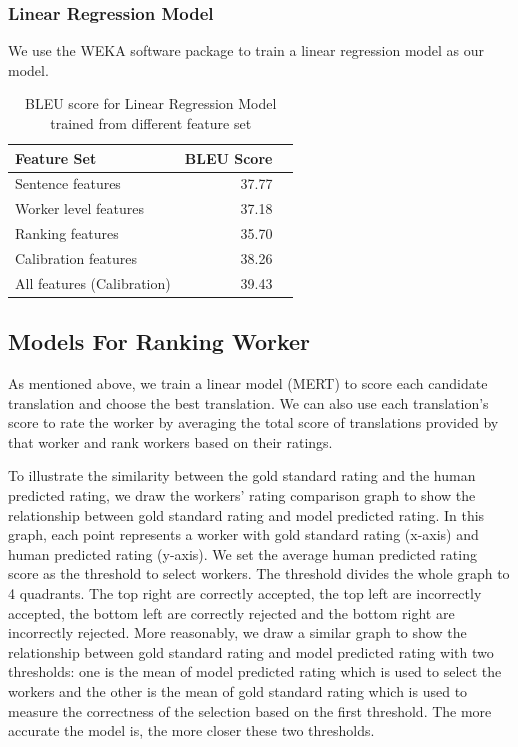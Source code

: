 \documentclass[11pt]{article}
\begin{document}
\subsubsection{Linear Regression  Model}
 We use the WEKA software package \cite{hall2009weka} to train a linear regression model as our model.
 \begin{table}[htbp]
\begin{center}
\begin{tabular}{|l|rl|}
\hline \bf Feature Set & \bf BLEU Score &\\ \hline
Sentence features & 37.77 &\\
Worker level features & 37.18  &\\
Ranking features & 35.70& \\
Calibration features & 38.26&\\
All features (Calibration) & 39.43 & \\
\hline
\end{tabular}
\end{center}
\caption{\label{tlrbleu} BLEU score for Linear Regression Model trained from different feature set }
\end{table}

\subsection{Models For Ranking Worker} 

As mentioned above, we train a linear model (MERT) to score each candidate translation and choose the best translation. We can also use each translation's score to rate the worker by averaging the total score of translations provided by that worker and rank workers based on their ratings. 

To illustrate the similarity between the gold standard rating and the human predicted rating, we draw the  workers' rating comparison graph to show the relationship between gold standard rating and model predicted rating. In this graph, each point represents a worker with gold standard rating (x-axis) and human predicted rating (y-axis). We set the average human predicted rating score as the threshold to select workers. The threshold divides the whole graph to  4 quadrants. The top right are correctly accepted, the top left are incorrectly accepted, the bottom left are correctly rejected and the bottom right are incorrectly rejected.
 More reasonably, we draw a similar graph to show the relationship between gold standard rating and model predicted rating with two thresholds: one is the mean of model predicted rating which is used to select the workers and the other is the mean of gold standard rating which is used to measure the correctness of the selection based on the first threshold. The more accurate the model is, the more closer these two thresholds. 
 
\end{document}
